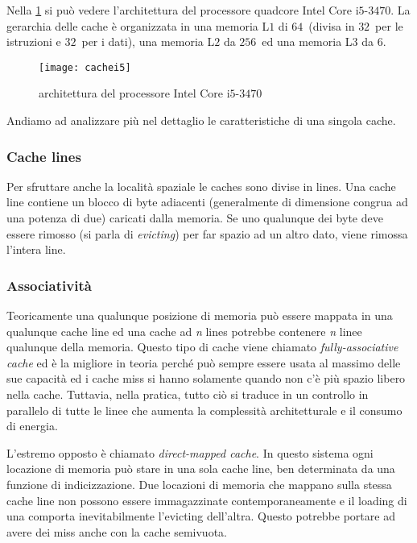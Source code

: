 			Nella \cref{fig:cachei5} si può vedere l'architettura del processore quadcore Intel Core i$5$-$3470$. La gerarchia delle cache è organizzata in una memoria L$1$ di $64$\kilobyte \ (divisa in $32$\kilobyte \ per le istruzioni e $32$\kilobyte \ per i dati), una memoria L$2$ da $256$\kilobyte \ ed una memoria L$3$ da $6$\megabyte.
			
			\begin{figure}
				\begin{center}
					\texttt{[image: cachei5]}
					\caption{architettura del processore Intel Core i$5$-$3470$}
					\label{fig:cachei5}
				\end{center}
			\end{figure}
			
			Andiamo ad analizzare più nel dettaglio le caratteristiche di una singola cache\cite{ge2016survey,yarom2014flush+}.
			
			\subsubsection{Cache lines}
				Per sfruttare anche la località spaziale le caches sono divise in lines. Una cache line contiene un blocco di byte adiacenti (generalmente di dimensione congrua ad una potenza di due) caricati dalla memoria. Se uno qualunque dei byte deve essere rimosso (si parla di \emph{evicting}) per far spazio ad un altro dato, viene rimossa l'intera line.
				
			\subsubsection{Associatività}
				Teoricamente una qualunque posizione di memoria può essere mappata in una qualunque cache line ed una cache ad \emph{n} lines potrebbe contenere \emph{n} linee qualunque della memoria. Questo tipo di cache viene chiamato \emph{fully-associative cache} ed è la migliore in teoria perché può sempre essere usata al massimo delle sue capacità ed i cache miss si hanno solamente quando non c'è più spazio libero nella cache. Tuttavia, nella pratica, tutto ciò si traduce in un controllo in parallelo di tutte le linee che aumenta la complessità architetturale e il consumo di energia.
				
				L'estremo opposto è chiamato \emph{direct-mapped cache}. In questo sistema ogni locazione di memoria può stare in una sola cache line, ben determinata da una funzione di indicizzazione. Due locazioni di memoria che mappano sulla stessa cache line non possono essere immagazzinate contemporaneamente e il loading di una comporta inevitabilmente l'evicting dell'altra. Questo potrebbe portare ad avere dei miss anche con la cache semivuota.
				
